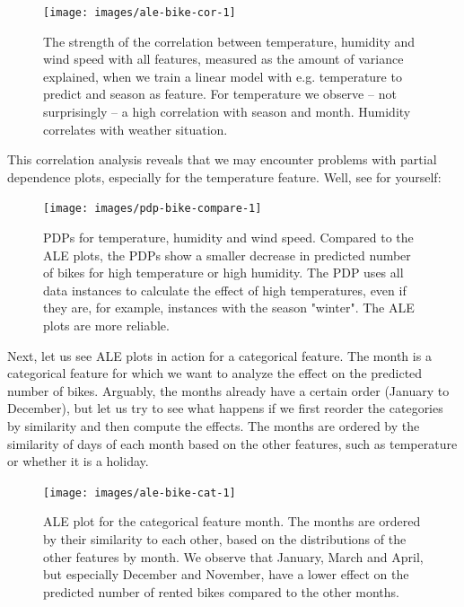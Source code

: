 \documentclass[
  12pt,
]{krantz}
\begin{document}
\begin{figure}

{\centering \texttt{[image: images/ale-bike-cor-1]} 

}

\caption{The strength of the correlation between temperature, humidity and wind speed with all features, measured as the amount of variance explained, when we train a linear model with e.g. temperature to predict and season as feature. For temperature we observe -- not surprisingly -- a high correlation with season and month. Humidity correlates with weather situation.}\label{fig:ale-bike-cor}
\end{figure}

This correlation analysis reveals that we may encounter problems with partial dependence plots, especially for the temperature feature.
Well, see for yourself:

\begin{figure}

{\centering \texttt{[image: images/pdp-bike-compare-1]} 

}

\caption{PDPs for temperature, humidity and wind speed. Compared to the ALE plots, the PDPs show a smaller decrease in predicted number of bikes for high temperature or high humidity. The PDP uses all data instances to calculate the effect of high temperatures, even if they are, for example, instances with the season "winter". The ALE plots are more reliable.}\label{fig:pdp-bike-compare}
\end{figure}

Next, let us see ALE plots in action for a categorical feature.
The month is a categorical feature for which we want to analyze the effect on the predicted number of bikes.
Arguably, the months already have a certain order (January to December), but let us try to see what happens if we first reorder the categories by similarity and then compute the effects.
The months are ordered by the similarity of days of each month based on the other features, such as temperature or whether it is a holiday.

\begin{figure}

{\centering \texttt{[image: images/ale-bike-cat-1]} 

}

\caption{ALE plot for the categorical feature month. The months are ordered by their similarity to each other, based on the distributions of the other features by month. We observe that January, March and April, but especially December and November, have a lower effect on the predicted number of rented bikes compared to the other months.}\label{fig:ale-bike-cat}
\end{figure}
\end{document}
